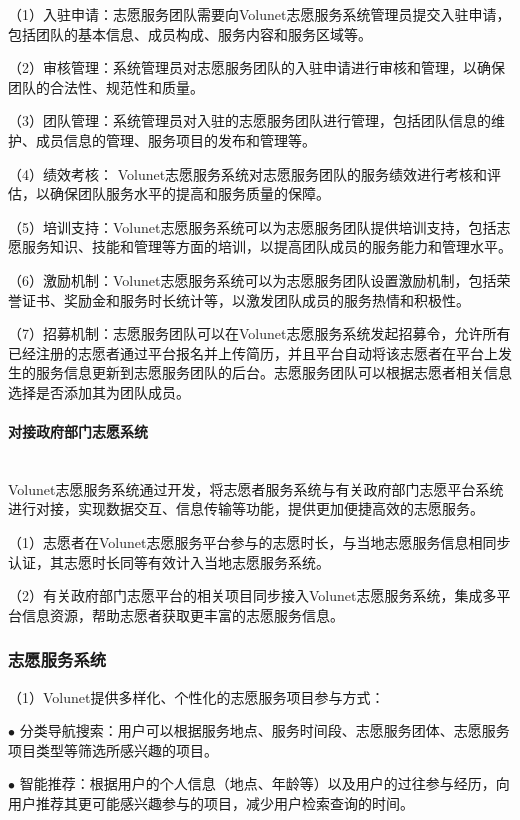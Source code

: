 （1）入驻申请：志愿服务团队需要向Volunet志愿服务系统管理员提交入驻申请，包括团队的基本信息、成员构成、服务内容和服务区域等。


（2）审核管理：系统管理员对志愿服务团队的入驻申请进行审核和管理，以确保团队的合法性、规范性和质量。

（3）团队管理：系统管理员对入驻的志愿服务团队进行管理，包括团队信息的维护、成员信息的管理、服务项目的发布和管理等。

（4）绩效考核： Volunet志愿服务系统对志愿服务团队的服务绩效进行考核和评估，以确保团队服务水平的提高和服务质量的保障。

（5）培训支持：Volunet志愿服务系统可以为志愿服务团队提供培训支持，包括志愿服务知识、技能和管理等方面的培训，以提高团队成员的服务能力和管理水平。

（6）激励机制：Volunet志愿服务系统可以为志愿服务团队设置激励机制，包括荣誉证书、奖励金和服务时长统计等，以激发团队成员的服务热情和积极性。

（7）招募机制：志愿服务团队可以在Volunet志愿服务系统发起招募令，允许所有已经注册的志愿者通过平台报名并上传简历，并且平台自动将该志愿者在平台上发生的服务信息更新到志愿服务团队的后台。志愿服务团队可以根据志愿者相关信息选择是否添加其为团队成员。


\paragraph{对接政府部门志愿系统}~{}
\\

Volunet志愿服务系统通过开发，将志愿者服务系统与有关政府部门志愿平台系统进行对接，实现数据交互、信息传输等功能，提供更加便捷高效的志愿服务。

（1）志愿者在Volunet志愿服务平台参与的志愿时长，与当地志愿服务信息相同步认证，其志愿时长同等有效计入当地志愿服务系统。

（2）有关政府部门志愿平台的相关项目同步接入Volunet志愿服务系统，集成多平台信息资源，帮助志愿者获取更丰富的志愿服务信息。


\subsubsection{志愿服务系统}

（1）Volunet提供多样化、个性化的志愿服务项目参与方式：

$\bullet$ 分类导航搜索：用户可以根据服务地点、服务时间段、志愿服务团体、志愿服务项目类型等筛选所感兴趣的项目。

$\bullet$ 智能推荐：根据用户的个人信息（地点、年龄等）以及用户的过往参与经历，向用户推荐其更可能感兴趣参与的项目，减少用户检索查询的时间。

